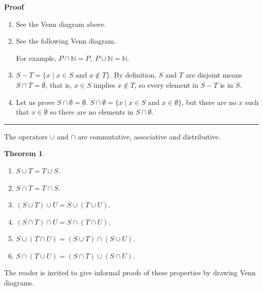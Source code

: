 \documentclass[12pt,a4paper]{article}
\newtheorem{theorem}{Theorem}
\newcommand*{\qed}{\hfill\rule[-2pt]{4pt}{10pt}}
\newenvironment{proof}{\textbf{Proof}}{\qed}
\begin{document}
\begin{proof}
\begin{enumerate}
\item See the Venn diagram above.

\item See the following Venn diagram.

\begin{center}
\end{center}

For example, $P \cap \mathbb{N} = P,\; P \cup \mathbb{N} = \mathbb{N}$.

\item $S-T=\{x\mid x\in S \textrm{\ and \ } x\not\in T\}$. By definition, $S$ and $T$ are disjoint means $S\cap T=\emptyset$, that is, $x\in S$ implies $x\not \in T$, so every element in $S-T$ is in $S$.  

\item Let us prove $S\cap \emptyset = \emptyset$. $S\cap \emptyset=\{x\mid x\in S \textrm{\ and \ } x\in \emptyset\}$, but there are no $x$ such that $x\in \emptyset$ so there are no elements in $S\cap \emptyset$.
\end{enumerate}\vspace{-4ex}
\end{proof}

The operators $\cup$ and $\cap$ are commutative, associative and distributive.

\begin{theorem}\mbox{}
\begin{enumerate}
\item $S \cup T = T \cup S$.
\item $S \cap T = T \cap S$.
\item $(S \cup T) \cup U = S \cup (T\cup U)$.
\item $(S \cap T) \cap U = S \cap (T\cap U)$.
\item $S \cup (T\cap U) = (S \cup T) \cap (S \cup U)$.
\item $S \cap (T\cup U) = (S \cap T) \cup (S \cap U).$
\end{enumerate}
\end{theorem}
The reader is invited to give informal proofs of these properties by drawing Venn diagrams.
\end{document}
